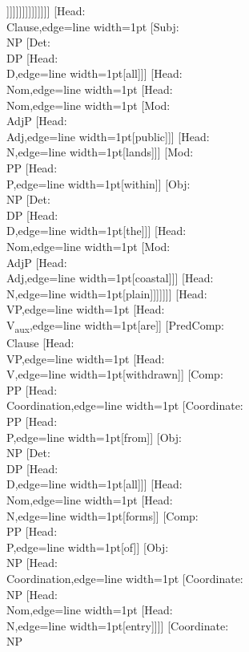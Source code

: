 \documentclass[tikz,border=12pt]{standalone}
\newcommand{\p}[1]{%
    \sethlcolor{white}\color{gray}\hl{#1}%
}
\newcommand{\Node}[2]{\small\textsf{#1:}\\{#2}}
\begin{document}
\begin{forest}
                                                        [\Node{Flat}{N}[1980,label={right:\p{{,}}}]]]]]]]]]]]]]]]
    [\Node{Head}{Clause},edge={line width=1pt}
        [\Node{Subj}{NP}
            [\Node{Det}{DP}
                [\Node{Head}{D},edge={line width=1pt}[all]]]
            [\Node{Head}{Nom},edge={line width=1pt}
                [\Node{Head}{Nom},edge={line width=1pt}
                    [\Node{Mod}{AdjP}
                        [\Node{Head}{Adj},edge={line width=1pt}[public]]]
                    [\Node{Head}{N},edge={line width=1pt}[lands]]]
                [\Node{Mod}{PP}
                    [\Node{Head}{P},edge={line width=1pt}[within]]
                    [\Node{Obj}{NP}
                        [\Node{Det}{DP}
                            [\Node{Head}{D},edge={line width=1pt}[the]]]
                        [\Node{Head}{Nom},edge={line width=1pt}
                            [\Node{Mod}{AdjP}
                                [\Node{Head}{Adj},edge={line width=1pt}[coastal]]]
                            [\Node{Head}{N},edge={line width=1pt}[plain]]]]]]]
        [\Node{Head}{VP},edge={line width=1pt}
            [\Node{Head}{V\textsubscript{aux}},edge={line width=1pt}[are]]
            [\Node{PredComp}{Clause}
                [\Node{Head}{VP},edge={line width=1pt}
                    [\Node{Head}{V},edge={line width=1pt}[withdrawn]]
                    [\Node{Comp}{PP}
                        [\Node{Head}{Coordination},edge={line width=1pt}
                            [\Node{Coordinate}{PP}
                                [\Node{Head}{P},edge={line width=1pt}[from]]
                                [\Node{Obj}{NP}
                                    [\Node{Det}{DP}
                                        [\Node{Head}{D},edge={line width=1pt}[all]]]
                                    [\Node{Head}{Nom},edge={line width=1pt}
                                        [\Node{Head}{N},edge={line width=1pt}[forms]]
                                        [\Node{Comp}{PP}
                                            [\Node{Head}{P},edge={line width=1pt}[of]]
                                            [\Node{Obj}{NP}
                                                [\Node{Head}{Coordination},edge={line width=1pt}
                                                    [\Node{Coordinate}{NP}
                                                        [\Node{Head}{Nom},edge={line width=1pt}
                                                            [\Node{Head}{N},edge={line width=1pt}[entry]]]]
                                                    [\Node{Coordinate}{NP}

\end{forest}
\end{document}
